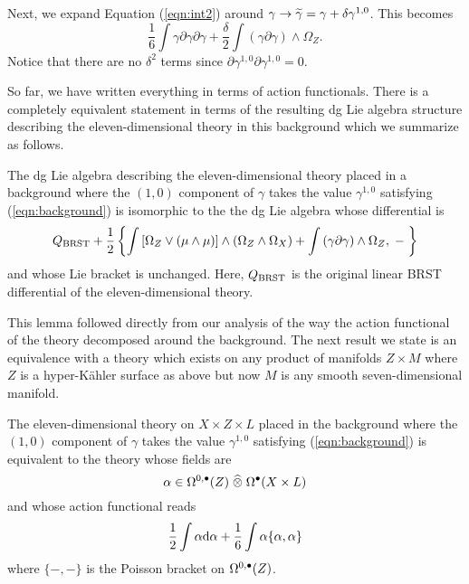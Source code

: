 \documentclass[11pt]{amsart}
\begin{document}
Next, we expand Equation (\ref{eqn:int2}) around $\gamma \to \Tilde{\gamma} = \gamma + \delta \gamma^{1,0}$.
This becomes
\[
  \frac16 \int \gamma \partial \gamma \partial \gamma + \frac{\delta}{2} \int \left(\gamma \partial \gamma\right) \wedge \Omega_Z .
\]
Notice that there are no $\delta^2$ terms since $\partial \gamma^{1,0} \partial \gamma^{1,0} = 0$.

So far, we have written everything in terms of action functionals.
There is a completely equivalent statement in terms of the resulting dg Lie algebra structure describing the eleven-dimensional theory in this background which we summarize as follows.

\begin{lem} \label{lem:background}
  The dg Lie algebra describing the eleven-dimensional theory placed in a background where the $(1,0)$ component of $\gamma$ takes the value $\gamma^{1,0}$ satisfying (\ref{eqn:background}) is isomorphic to the the dg Lie algebra whose differential is
  \begin{equation}\label{eqn:newdiff}
    Q_{\rm BRST} + \frac{1}{2} \left\{ \int \left[\Omega_Z \vee (\mu \wedge \mu) \right] \wedge (\Omega_Z \wedge \Omega_X) + \int \left(\gamma \partial \gamma\right) \wedge \Omega_Z , \; - \; \right\}
  \end{equation}
  and whose Lie bracket is unchanged.
  Here, $Q_{\rm BRST}$ is the original linear BRST differential of the eleven-dimensional theory.
\end{lem}

This lemma followed directly from our analysis of the way the action functional of the theory decomposed around the background.
The next result we state is an equivalence with a theory which exists on any product of manifolds $Z \times M$ where $Z$ is a hyper-K\"{a}hler surface as above but now $M$ is any smooth seven-dimensional manifold.

\begin{prop}
  The eleven-dimensional theory on $X \times Z \times L$ placed in the background where the $(1,0)$ component of $\gamma$ takes the value $\gamma^{1,0}$ satisfying (\ref{eqn:background}) is equivalent to the theory whose fields are
  \[
    \alpha \in \Omega^{0,\bu}(Z) \; \Hat{\otimes} \; \Omega^\bu(X \times L)
  \]
  and whose action functional reads
  \[
    \frac12 \int \alpha \d\alpha + \frac16 \int \alpha \{\alpha, \alpha\}
  \]
  where $\{-,-\}$ is the Poisson bracket on $\Omega^{0,\bu}(Z)$.
\end{prop}
\end{document}
